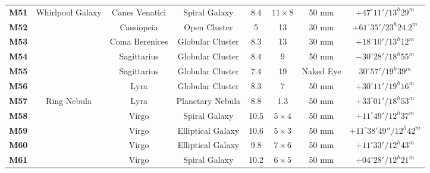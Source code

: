 \documentclass[a4paper,12pt]{extarticle}
\begin{document}
\begin{table}[H]
\begin{tabular}{cccccccc}
\rowcolor[HTML]{00FFFF} 
\textbf{M51} & \multicolumn{1}{c}{\cellcolor[HTML]{00FFFF}Whirlpool Galaxy} & Canes Venatici & Spiral Galaxy     & 8.4 & $11\times8$ & 50 mm     & $+47^\circ 11'/ 13^h 29^m $     \\
\rowcolor[HTML]{D9EAD3} 
\textbf{M52} &                                                              & Cassiopeia     & Open Cluster      & 5 & 13  & 30 mm     & $+61^\circ 35'/ 23^h 24.2^m$    \\
\rowcolor[HTML]{FFF2CC} 
\textbf{M53} &                                                              & Coma Berenices & Globular Cluster  & 8.3 & 13  & 30 mm     & $+18^\circ 10'/ 13^h 12^m $     \\
\rowcolor[HTML]{FFF2CC} 
\textbf{M54} &                                                              & Sagittarius    & Globular Cluster  & 8.4 & 9   & 50 mm     & $-30^\circ 28'/ 18^h 55^m $     \\
\rowcolor[HTML]{FFF2CC} 
\textbf{M55} &                                                              & Sagittarius    & Globular Cluster  & 7.4 & 19  & Naked Eye & $30^\circ 57'/ 19^h 39^m $      \\
\rowcolor[HTML]{FFF2CC} 
\textbf{M56} &                                                              & Lyra           & Globular Cluster  & 8.3 & 7   & 50 mm     & $+30^\circ 11'/ 19^h 16^m$      \\
\rowcolor[HTML]{D0E0E3} 
\textbf{M57} & \multicolumn{1}{c}{\cellcolor[HTML]{D0E0E3}Ring Nebula}      & Lyra           & Planetary Nebula  & 8.8 & 1.3 & 50 mm     & $+33^\circ 01'/ 18^h 53^m $     \\
\rowcolor[HTML]{00FFFF} 
\textbf{M58} &                                                              & Virgo          & Spiral Galaxy     & 10.5 & $5\times4$  & 50 mm     & $+11^\circ 49'/ 12^h 37^m $     \\
\rowcolor[HTML]{F3F3F3} 
\textbf{M59} &                                                              & Virgo          & Elliptical Galaxy & 10.6 & $5\times3$  & 50 mm     & $+11^\circ 38' 49''/ 12^h 42^m$ \\
\rowcolor[HTML]{F3F3F3} 
\textbf{M60} &                                                              & Virgo          & Elliptical Galaxy & 9.8 & $7\times6$  & 50 mm     & $+11^\circ 33'/ 12^h 43^m$     \\
\rowcolor[HTML]{00FFFF} 
\textbf{M61} &                                                              & Virgo          & Spiral Galaxy    & 10.2 & $6\times5$  & 50 mm                                        & $+04^\circ 28'/ 12^h 21^m$   \\

\end{tabular}
\end{table}
\end{document}
